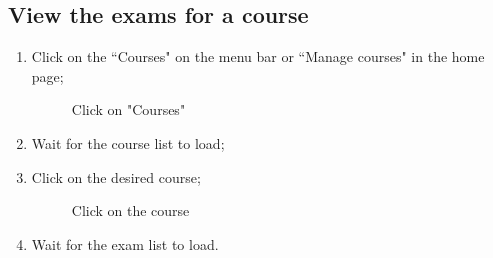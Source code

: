 \documentclass[ManualeUtente]{subfiles}
\begin{document}
\subsection{View the exams for a course}
\begin{enumerate}
	\item Click on the \textquotedblleft Courses" on the menu bar or \textquotedblleft Manage courses" in the home page;
	\begin{figure}[H]
		\centering
		\caption{Click on "Courses"}
		\label{fig:Click on "Courses"}
	\end{figure}
	\item Wait for the course list to load;
	\item Click on the desired course;
	\begin{figure}[H]
		\centering
		\caption{Click on the course}
		\label{fig:Click on the course}
	\end{figure}
	\item Wait for the exam list to load.

\end{enumerate}
\end{document}
